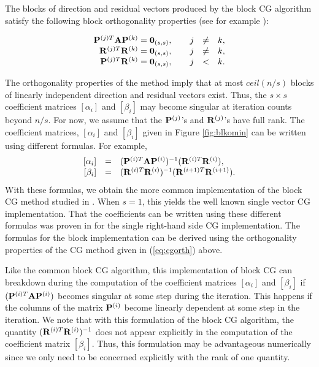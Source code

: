 \documentclass[twoside]{siamltex}
\newcommand{\bA}{{\bf A}}
\newcommand{\bP}{{\bf P}}
\newcommand{\bR}{{\bf R}}
\newcommand{\dm}{\begin{displaymath}}
\newcommand{\edm}{\end{displaymath}}
\newcommand{\eq}{\begin{equation}}
\newcommand{\eeq}{\end{equation}}
\begin{document}
The blocks of direction and residual vectors produced by the block
CG algorithm satisfy the following block orthogonality properties
(see for example \cite{olea:80}):

 \eq
 \begin{array}{rcl}
  \bP^{(j)T} \bA \bP^{(k)} = {\bf 0}_{(s,s)}, \qquad j &\ne& k, \\
  \bR^{(j)T} \bR^{(k)} = {\bf 0}_{(s,s)}, \qquad j &\ne& k, \\
  \bP^{(j)T} \bR^{(k)} = {\bf 0}_{(s,s)}, \qquad j &<& k.
  \end{array}
  \label{eq:cgorth}
  \eeq

The orthogonality properties of the method imply that at most
$ceil(n/s)$ blocks of linearly independent direction and residual
vectors exist. Thus, the $s \times s$ coefficient matrices
$[\alpha_i]$ and $[\beta_i]$ may become singular at iteration
counts beyond $n/s$. For now, we assume that the $\bP^{(j)}$'s and
$\bR^{(j)}$'s have full rank. The coefficient matrices,
$[\alpha_i]$ and $[\beta_i]$ given in Figure \ref{fig:blkomin} can
be written using different formulas. For example,
 \dm
 \begin{array}{rcl}
  \left[ \alpha_i \right] &=& ( \bP^{(i)T} \bA \bP^{(i)} )^{-1} ( \bR^{(i)T}
  \bR^{(i)} ), \\
  \left[ \beta_i \right] &=& ( \bR^{(i)T} \bR^{(i)} )^{-1} ( \bR^{(i+1)T}
  \bR^{(i+1)} ).
  \end{array}
 \edm
With these formulas, we obtain the more common implementation of
the block CG method studied in \cite{olea:80}. When $s=1$, this
yields the well known single vector CG implementation. That the
coefficients can be written using these different formulas was
proven in \cite{HS52} for the single right-hand side CG
implementation. The formulas for the block implementation can be
derived using the orthogonality properties of the CG method given
in (\ref{eq:cgorth}) above.

Like the common block CG algorithm, this implementation of block
CG can breakdown during the computation of the coefficient
matrices $[\alpha_i]$ and $[\beta_i]$ if $(\bP^{(i)T} \bA
\bP^{(i)})$ becomes singular at some step during the iteration.
This happens if the columns of the matrix $\bP^{(i)}$ become
linearly dependent at some step in the iteration. We note that
with this formulation of the block CG algorithm, the quantity
$(\bR^{(i)T} \bR^{(i)})^{-1}$ does not appear explicitly in the
computation of the coefficient matrix $[\beta_i]$. Thus, this
formulation may be advantageous numerically since we only need to
be concerned explicitly with the rank of one quantity.
\end{document}
